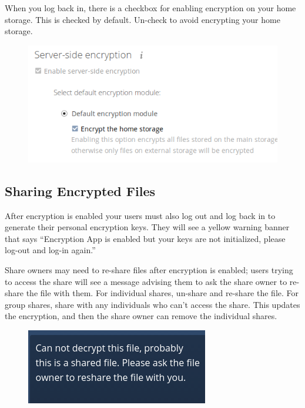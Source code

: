 \documentclass[letterpaper,10pt,english]{sphinxmanual}
\begin{document}
When you log back in, there is a checkbox for enabling encryption on your home
storage. This is checked by default. Un-check to avoid encrypting your home
storage.
\begin{figure}[htbp]
\centering

\includegraphics{encryption15.png}
\end{figure}


\subsection{Sharing Encrypted Files}
\label{configuration_files/encryption_configuration:sharing-encrypted-files}
After encryption is enabled your users must also log out and log back in to
generate their personal encryption keys. They will see a yellow warning banner
that says ``Encryption App is enabled but your keys are not initialized, please
log-out and log-in again.''

Share owners may need to re-share files after encryption is enabled; users
trying to access the share will see a message advising them to ask the share
owner to re-share the file with them. For individual shares, un-share and
re-share the file. For group shares, share with any individuals who can't access
the share. This updates the encryption, and then the share owner can remove the
individual shares.
\begin{figure}[htbp]
\centering

\includegraphics{encryption9.png}
\end{figure}
\end{document}
